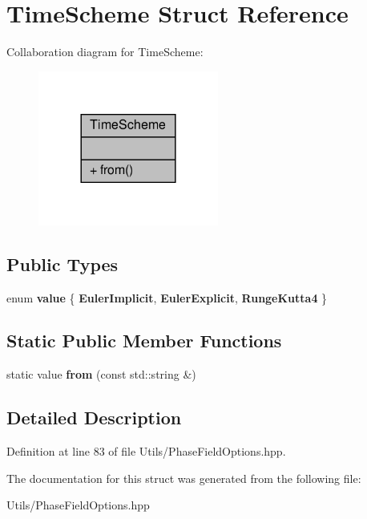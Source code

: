 \hypertarget{structTimeScheme}{}\section{Time\+Scheme Struct Reference}
\label{structTimeScheme}


Collaboration diagram for Time\+Scheme\+:\nopagebreak
\begin{figure}[H]
\begin{center}
\leavevmode
\includegraphics[width=168pt]{structTimeScheme__coll__graph}
\end{center}
\end{figure}
\subsection*{Public Types}
\begin{DoxyCompactItemize}
\item 
\mbox{\label{structTimeScheme_a29f8ffca06683f47a693e679d0d1a0e6}} 
enum {\bfseries value} \{ {\bfseries Euler\+Implicit}, 
{\bfseries Euler\+Explicit}, 
{\bfseries Runge\+Kutta4}
 \}
\end{DoxyCompactItemize}
\subsection*{Static Public Member Functions}
\begin{DoxyCompactItemize}
\item 
\mbox{\label{structTimeScheme_aac011aba84db035d8b7bd83bae1bb1c1}} 
static value {\bfseries from} (const std\+::string \&)
\end{DoxyCompactItemize}


\subsection{Detailed Description}


Definition at line 83 of file Utils/\+Phase\+Field\+Options.\+hpp.



The documentation for this struct was generated from the following file\+:\begin{DoxyCompactItemize}
\item 
Utils/\+Phase\+Field\+Options.\+hpp\end{DoxyCompactItemize}
